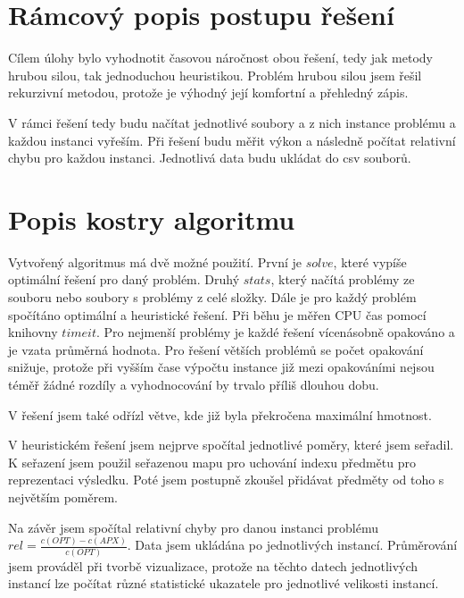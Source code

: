 \documentclass[11pt]{article}
\begin{document}
\section{Rámcový popis postupu řešení}
Cílem úlohy bylo vyhodnotit časovou náročnost obou řešení, tedy jak metody hrubou silou, tak jednoduchou heuristikou. Problém hrubou silou jsem řešil rekurzivní metodou, protože je výhodný její komfortní a přehledný zápis. 

V rámci řešení tedy budu načítat jednotlivé soubory a z nich instance problému a každou instanci vyřeším. Při řešení budu měřit výkon a následně počítat relativní chybu pro každou instanci. Jednotlivá data budu ukládat do csv souborů.

\section{Popis kostry algoritmu}\label{kap:1}
Vytvořený algoritmus má dvě možné použití. První je $solve$, které vypíše optimální řešení pro daný problém. Druhý $stats$, který načítá problémy ze souboru nebo soubory s problémy z celé složky. Dále je pro každý problém spočítáno optimální a heuristické řešení. Při běhu je měřen CPU čas pomocí knihovny $timeit$. Pro nejmenší problémy je každé řešení vícenásobně opakováno a je vzata průměrná hodnota. Pro řešení větších problémů se počet opakování snižuje, protože při vyšším čase výpočtu instance již mezi opakováními nejsou téměř žádné rozdíly a vyhodnocování by trvalo příliš dlouhou dobu.

V řešení jsem také odřízl větve, kde již byla překročena maximální hmotnost.

V heuristickém řešení jsem nejprve spočítal jednotlivé poměry, které jsem seřadil. K seřazení jsem použil seřazenou mapu pro uchování indexu předmětu pro reprezentaci výsledku. Poté jsem postupně zkoušel přidávat předměty od toho s největším poměrem.

Na závěr jsem spočítal relativní chyby pro danou instanci problému $rel = \frac{c(OPT) - c(APX)}{c(OPT)}$. Data jsem ukládána po jednotlivých instancí. Průměrování jsem prováděl při tvorbě vizualizace, protože na těchto datech jednotlivých instancí lze počítat různé statistické ukazatele pro jednotlivé velikosti instancí.
\end{document}
